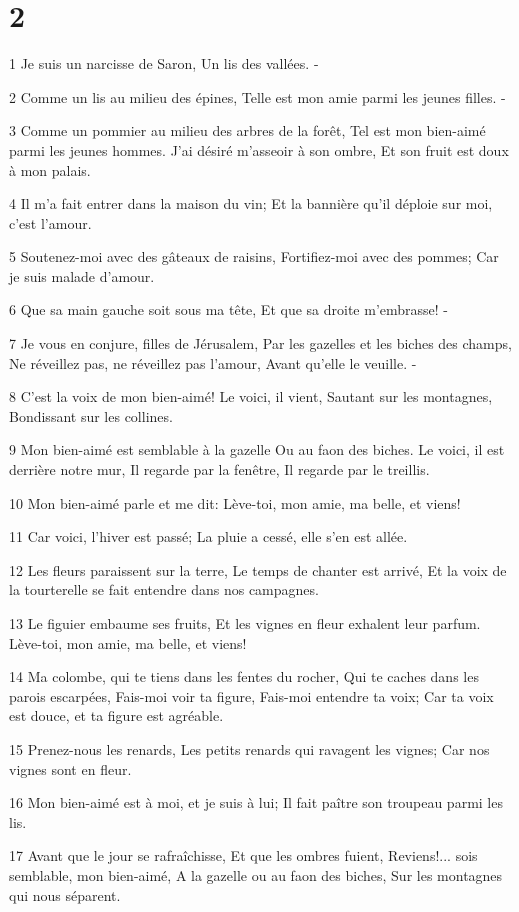 \chapter{2}

\par 1 Je suis un narcisse de Saron, Un lis des vallées. -
\par 2 Comme un lis au milieu des épines, Telle est mon amie parmi les jeunes filles. -
\par 3 Comme un pommier au milieu des arbres de la forêt, Tel est mon bien-aimé parmi les jeunes hommes. J'ai désiré m'asseoir à son ombre, Et son fruit est doux à mon palais.
\par 4 Il m'a fait entrer dans la maison du vin; Et la bannière qu'il déploie sur moi, c'est l'amour.
\par 5 Soutenez-moi avec des gâteaux de raisins, Fortifiez-moi avec des pommes; Car je suis malade d'amour.
\par 6 Que sa main gauche soit sous ma tête, Et que sa droite m'embrasse! -
\par 7 Je vous en conjure, filles de Jérusalem, Par les gazelles et les biches des champs, Ne réveillez pas, ne réveillez pas l'amour, Avant qu'elle le veuille. -
\par 8 C'est la voix de mon bien-aimé! Le voici, il vient, Sautant sur les montagnes, Bondissant sur les collines.
\par 9 Mon bien-aimé est semblable à la gazelle Ou au faon des biches. Le voici, il est derrière notre mur, Il regarde par la fenêtre, Il regarde par le treillis.
\par 10 Mon bien-aimé parle et me dit: Lève-toi, mon amie, ma belle, et viens!
\par 11 Car voici, l'hiver est passé; La pluie a cessé, elle s'en est allée.
\par 12 Les fleurs paraissent sur la terre, Le temps de chanter est arrivé, Et la voix de la tourterelle se fait entendre dans nos campagnes.
\par 13 Le figuier embaume ses fruits, Et les vignes en fleur exhalent leur parfum. Lève-toi, mon amie, ma belle, et viens!
\par 14 Ma colombe, qui te tiens dans les fentes du rocher, Qui te caches dans les parois escarpées, Fais-moi voir ta figure, Fais-moi entendre ta voix; Car ta voix est douce, et ta figure est agréable.
\par 15 Prenez-nous les renards, Les petits renards qui ravagent les vignes; Car nos vignes sont en fleur.
\par 16 Mon bien-aimé est à moi, et je suis à lui; Il fait paître son troupeau parmi les lis.
\par 17 Avant que le jour se rafraîchisse, Et que les ombres fuient, Reviens!... sois semblable, mon bien-aimé, A la gazelle ou au faon des biches, Sur les montagnes qui nous séparent.

